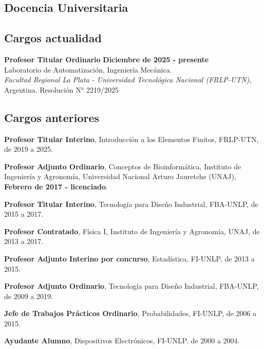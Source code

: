 \documentclass[margin,line]{res}
\begin{document}
\begin{resume}
\section{ Docencia Universitaria}
\vspace*{-.2in}
\subsection{ Cargos actualidad}

{\bf Profesor Titular Ordinario} \hfill {\bf Diciembre de 2025  - presente}\\
Laboratorio de Automatización, Ingeniería Mecánica.\\
{\em Facultad Regional La Plata - Universidad Tecnológica Nacional (FRLP-UTN)}, Argentina. Resolución N° 2219/2025

\vspace*{-.1in}
\subsection{ Cargos anteriores}
\vspace*{-.1in}


{\bf Profesor Titular Interino}, Introducción a los Elementos Finitos, FRLP-UTN, de 2019 a 2025.

{\bf Profesor Adjunto Ordinario}, Conceptos de Bioinformática, Instituto de Ingeniería y Agronomía, Universidad Nacional Arturo Jauretche (UNAJ),  {\bf Febrero de 2017  - licenciado}.

{\bf Profesor Titular Interino}, Tecnología para Diseño Industrial, FBA-UNLP, de 2015 a 2017.

{\bf Profesor Contratado}, Física I, Instituto de Ingeniería y Agronomía, UNAJ, de 2013 a 2017.

{\bf Profesor Adjunto Interino por concurso}, Estadística, FI-UNLP, de 2013 a 2015.

{\bf Profesor Adjunto Ordinario}, Tecnología para Diseño Industrial, FBA-UNLP, de 2009 a 2019.

{\bf Jefe de Trabajos Prácticos Ordinario}, Probabilidades, FI-UNLP, de 2006 a 2015.


{\bf Ayudante Alumno}, Dispositivos Electrónicos, FI-UNLP. de 2000 a 2004.



\end{resume}
\end{document}
